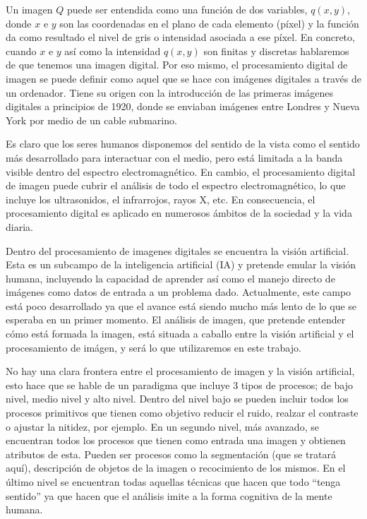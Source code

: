 Un imagen $Q$ puede ser entendida como una función de dos variables, $q(x,y)$, donde $x$ e $y$ son las coordenadas en el plano de cada elemento (píxel) y la función da como resultado el nivel de gris o intensidad asociada a ese píxel. En concreto, cuando $x$ e $y$ así como la intensidad $q(x,y)$ son finitas y discretas hablaremos de que tenemos una imagen digital. Por eso mismo, el procesamiento digital de imagen se puede definir como aquel que se hace con imágenes digitales a través de un ordenador. Tiene su origen con la introducción de las primeras imágenes digitales a principios de 1920, donde se enviaban imágenes entre Londres y Nueva York por medio de un cable submarino.

Es claro que los seres humanos disponemos del sentido de la vista como el sentido más desarrollado para interactuar con el medio, pero está limitada a la banda visible dentro del espectro electromagnético. En cambio, el procesamiento digital de imagen puede cubrir el análisis de todo el espectro electromagnético, lo que incluye los ultrasonidos, el infrarrojos, rayos X, etc. En consecuencia, el procesamiento digital es aplicado en numerosos ámbitos de la sociedad y la vida diaria.

Dentro del procesamiento de imagenes digitales se encuentra la visión artificial. Esta es un subcampo de la inteligencia artificial (IA) y pretende emular la visión humana, incluyendo la capacidad de aprender así como el manejo directo de imágenes como datos de entrada a un problema dado. Actualmente, este campo está poco desarrollado \cite{lib:gonzalez} ya que el avance está siendo mucho más lento de lo que se esperaba en un primer momento. El análisis de imagen, que pretende entender cómo está formada la imagen, está situada a caballo entre la visión artificial y el procesamiento de imágen, y será lo que utilizaremos en este trabajo.

No hay una clara frontera entre el procesamiento de imagen y la visión artificial, esto hace que se hable de un paradigma que incluye 3 tipos de procesos; de bajo nivel, medio nivel y alto nivel. Dentro del nivel bajo se pueden incluir todos los procesos primitivos que tienen como objetivo reducir el ruido, realzar el contraste o ajustar la nitidez, por ejemplo. En un segundo nivel, más avanzado, se encuentran todos los procesos que tienen como entrada una imagen y obtienen atributos de esta. Pueden ser procesos como la segmentación (que se tratará aquí), descripción de objetos de la imagen o recocimiento de los mismos. En el último nivel se encuentran todas aquellas técnicas que hacen que todo ``tenga sentido'' ya que hacen que el análisis imite a la forma cognitiva de la mente humana.


